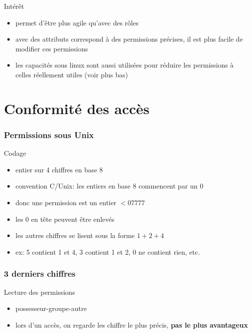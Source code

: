 \begin{reveals}
\begin{frame}
  \begin{block}{Intérêt}
    \begin{itemize}
    \item permet d'être plus agile qu'avec des rôles
    \item avec des attributs correspond à des permissions précises,
      il est plus facile de modifier ces permissions
    \item les capacités sous linux sont aussi utilisées pour réduire
      les permissions à celles réellement utiles (voir plus bas)
    \end{itemize}
  \end{block}

  \vfill

\end{frame}

\section{Conformité des accès}

\begin{frame}
  \frametitle{Permissions sous Unix}

  \vfill

  \begin{block}{Codage}
    \begin{itemize}
    \item entier sur 4 chiffres en base 8
    \item convention C/Unix: les entiers en base 8 commencent par un 0
    \item donc une permission est un entier \(< 07777\)
    \item les 0 en tête peuvent être enlevés
    \item les autres chiffres se lisent sous la forme \(1 +2 +4\)
    \item ex: 5 contient 1 et 4, 3 contient 1 et 2, 0 ne contient
      rien, etc.
    \end{itemize}
  \end{block}

  \vfill
\end{frame}


\begin{frame}
  \frametitle{3 derniers chiffres}

  \vfill

  \begin{block}{Lecture des permissions}
    \begin{itemize}
    \item possesseur-groupe-autre
    \item lors d'un accès, on regarde les chiffre le plus précis,
      \textbf{pas le plus avantageux}
    \end{itemize}
  \end{block}


\end{frame}
\end{reveals}
